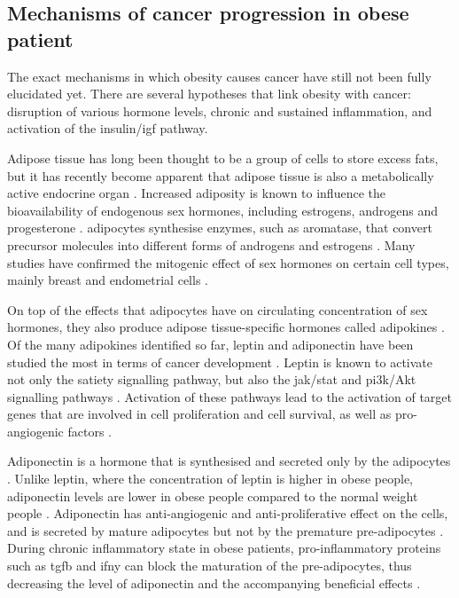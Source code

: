 \subsection{Mechanisms of cancer progression in obese patient}
\label{sub:mechanisms_of_cancer_progression_in_obese_patient}

The exact mechanisms in which obesity causes cancer have still not been fully elucidated yet.
There are several hypotheses that link obesity with cancer: disruption of various hormone levels, chronic and sustained inflammation, and activation of the insulin/\gls{igf} pathway.

Adipose tissue has long been thought to be a group of cells to store excess fats, but it has recently become apparent that adipose tissue is also a metabolically active endocrine organ \citep{Roberts2010}.
Increased adiposity is known to influence the bioavailability of endogenous sex hormones, including estrogens, androgens and progesterone \citep{Calle2004}.
\Glspl{adipocyte} synthesise enzymes, such as aromatase, that convert precursor molecules into different forms of androgens and estrogens \citep{Calle2004}.
Many studies have confirmed the mitogenic effect of sex hormones on certain cell types, mainly breast and endometrial cells \citep{Roberts2010}.

On top of the effects that \glspl{adipocyte} have on circulating concentration of sex hormones, they also produce adipose tissue-specific hormones called adipokines \citep{Roberts2010}.
Of the many adipokines identified so far, leptin and adipo\-nectin have been studied the most in terms of cancer development \citep{Renehan2006,Roberts2010}.
Leptin is known to activate not only the satiety signalling pathway, but also the \gls{jak}/\gls{stat} and \gls{pi3k}/Akt signalling pathways \citep{Garofalo2006,Renehan2006}.
Activation of these pathways lead to the activation of target genes that are involved in cell proliferation and cell survival, as well as pro-angiogenic factors \citep{Garofalo2006}.

Adiponectin is a hormone that is synthesised and secreted only by the \glspl{adipocyte} \citep{Kelesidis2006}.
Unlike leptin, where the concentration of leptin is higher in obese people, adiponectin levels are lower in obese people compared to the normal weight people \citep{Kelesidis2006,Renehan2006}.
Adiponectin has anti-angiogenic and anti-proliferative effect on the cells, and is secreted by mature adipocytes but not by the premature pre-adipocytes \citep{Gilbert2013}.
During chronic inflammatory state in obese patients, pro-inflammatory proteins such as \gls{tgfb} and \gls{ifny} can block the maturation of the pre-adipocytes, thus decreasing the level of adiponectin and the accompanying beneficial effects \citep{Gilbert2013}.

